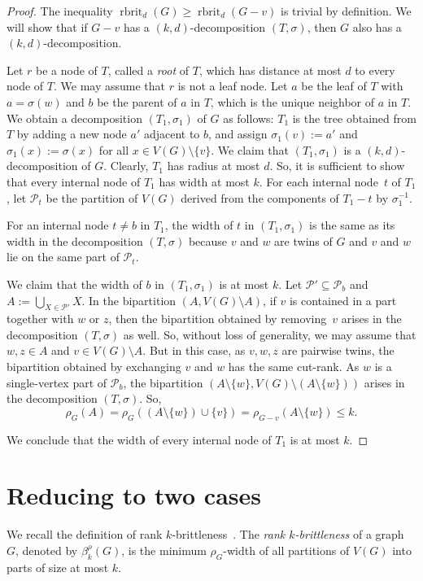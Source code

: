 \documentclass[11pt]{article}
\newcommand\rkbrit{\beta^\cutrk}
\newcommand\cutrk{\rho}
\newcommand\rbrit{\operatorname{rbrit}}
\begin{document}
	\begin{proof}
	The inequality $\rbrit_d(G)\ge \rbrit_d(G-v)$ is trivial by definition.
    We will show that if $G-v$ has a $(k,d)$-decomposition $(T,\sigma)$,
    then $G$ also has a $(k,d)$-decomposition.

%
          Let $r$ be a node of $T$, called a \emph{root} of $T$,
          which has distance at most $d$ to every node of $T$.
%
%
%
%
	We may assume that 
	$r$ is not a leaf node.
	Let $a$ be the leaf of $T$ with $a=\sigma(w)$ and $b$ be the parent of $a$ in $T$, which is the unique neighbor of $a$ in $T$.
	We obtain a decomposition $(T_1, \sigma_1)$ of $G$ as follows:
	$T_1$ is the tree obtained from $T$ by adding a new node $a'$ adjacent to $b$, 
	and assign $\sigma_1(v):=a'$ and $\sigma_1(x):=\sigma(x)$ for all $x\in V(G)\setminus \{v\}$.
	We claim that $(T_1, \sigma_1)$ is a $(k, d)$-decomposition of $G$.
	Clearly, $T_1$ has radius at most $d$. So, it is sufficient to show that every internal node of $T_1$ has width at most $k$.
	For each internal node~$t$ of $T_1$, let $\mathcal{P}_t$ be the partition of $V(G)$ derived from the components of $T_1-t$ by $\sigma_1^{-1}$.

		For an internal node $t\neq b$ in $T_1$, the width of $t$ in $(T_1, \sigma_1)$ is the same as its width in the decomposition $(T, \sigma)$
		because $v$ and $w$ are twins of $G$ and $v$ and $w$ lie on the same part of $\mathcal{P}_t$.
		
		We claim that the width of $b$ in $(T_1, \sigma_1)$ is at most $k$.
		Let $\mathcal{P'}\subseteq \mathcal{P}_b$ and $A:=\bigcup_{X \in \mathcal{P'} } X$.
		In the bipartition 
		$(A, V(G)\setminus A)$, if $v$ is contained in a part together with $w$ or $z$, 
		then the bipartition obtained by removing~$v$  arises in the decomposition $(T, \sigma)$ as well.
		So, without loss of generality, we may assume that $w,z\in A$ and $v\in V(G)\setminus A$.
		But in this case, as $v,w,z$ are pairwise twins, 
		the bipartition obtained by exchanging $v$ and $w$ has the same cut-rank.
		As $w$ is a single-vertex part of $\mathcal{P}_b$,
		the bipartition $(A\setminus \{w\}, V(G)\setminus (A\setminus \{w\}))$ arises in the decomposition $(T, \sigma)$. 
		So, 
		\[\rho_G(A)=\rho_G((A\setminus \{w\})\cup \{v\})=\rho_{G-v}(A\setminus \{w\})\le k.\]

		We conclude that the width of every internal node of $T_1$ is at most $k$.
\end{proof}
	
	\section{Reducing to two cases}\label{sec:construction}
  We recall the definition of rank $k$-brittleness~\cite{KO2018sca}.
  The \emph{rank $k$-brittleness} of a graph $G$, denoted by $\rkbrit_k(G)$,
  is the minimum $\rho_G$-width of all partitions of $V(G)$ into 
  parts of size at most $k$.
\end{document}
